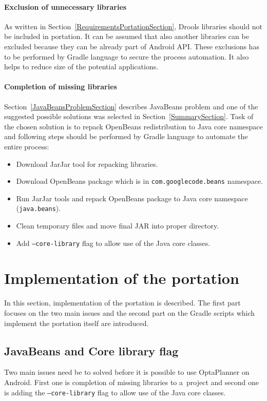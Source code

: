 \paragraph{Exclusion of unnecessary libraries}
As written in Section~\ref{RequirementsPortationSection}, Drools libraries should not be included in portation. It can
be assumed that also another libraries can be excluded because they can be already part of Android API. These exclusions
has to be performed by Gradle language to secure the process automation. It also helps to reduce size of the potential
applications.

\paragraph{Completion of missing libraries}
Section~\ref{JavaBeansProblemSection} describes JavaBeans problem and one of the suggested possible solutions was
selected in Section~\ref{SummarySection}. Task of the chosen solution is to repack OpenBeans redistribution to Java core
namespace and following steps should be performed by Gradle language to automate the entire process:

\begin{itemize}
    \item Download JarJar tool for repacking libraries.
    \item Download OpenBeans package which is in \texttt{com.googlecode.beans} namespace.
    \item Run JarJar tools and repack OpenBeans package to Java core namespace (\texttt{java.beans}).
    \item Clean temporary files and move final JAR into proper directory.
    \item Add \texttt{--core-library} flag to allow use of the Java core classes.
\end{itemize}

\section{Implementation of the portation}\label{PortationImplSection}
In this section, implementation of the portation is described. The first part focuses on the two main issues and the
second part on the Gradle scripts which implement the portation itself are introduced.

\subsection{JavaBeans and Core library flag}\label{JavaBeansCoreLibFlagSection}
Two main issues need be to solved before it is possible to use OptaPlanner on Android. First one is completion of
missing libraries to a~project and second one is adding the \texttt{--core-library} flag to allow use of the Java core
classes.


